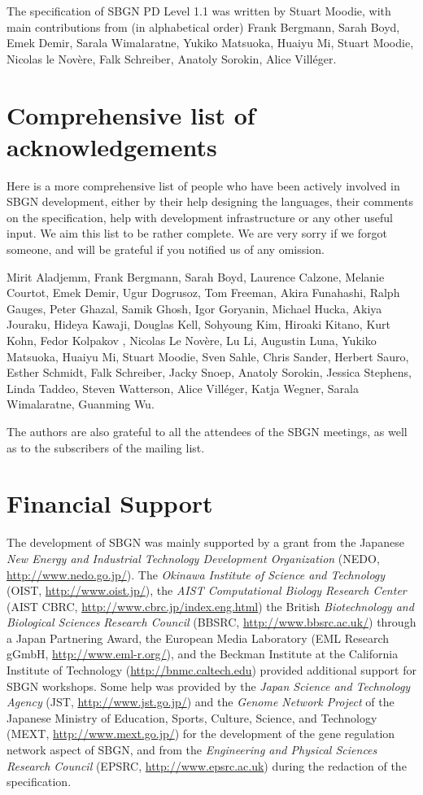The specification of SBGN PD Level 1.1 was written by Stuart Moodie, with 
main contributions from (in alphabetical order) Frank Bergmann, Sarah Boyd, 
Emek Demir, Sarala Wimalaratne, Yukiko Matsuoka, Huaiyu Mi, Stuart Moodie, 
Nicolas le Nov\`{e}re, Falk Schreiber, Anatoly Sorokin, Alice Vill\'{e}ger.

\section{Comprehensive list of acknowledgements}

Here is a more comprehensive list of people who have been actively involved 
in SBGN development, either by their help designing the languages, their 
comments on the specification, help with development infrastructure or any 
other useful input.  We aim this list to be rather complete. We are very 
sorry if we forgot someone, and will be grateful if you notified us of any 
omission.

Mirit Aladjemm, Frank Bergmann, Sarah Boyd, Laurence Calzone, Melanie 
Courtot, Emek Demir, Ugur Dogrusoz, Tom Freeman, Akira Funahashi, Ralph 
Gauges, Peter Ghazal, Samik Ghosh, Igor Goryanin, Michael Hucka, Akiya 
Jouraku, Hideya Kawaji, Douglas Kell, Sohyoung Kim, Hiroaki Kitano, Kurt 
Kohn, Fedor Kolpakov , Nicolas Le Nov\`{e}re, Lu Li, Augustin Luna, Yukiko 
Matsuoka, Huaiyu Mi, Stuart Moodie, Sven Sahle, Chris Sander, Herbert 
Sauro, Esther Schmidt, Falk Schreiber, Jacky Snoep, Anatoly Sorokin, 
Jessica Stephens, Linda Taddeo, Steven Watterson, Alice Vill\'{e}ger, Katja 
Wegner, Sarala Wimalaratne, Guanming Wu.

The authors are also grateful to all the attendees of the SBGN meetings, as 
well as to the subscribers of the  mailing list.


\section{Financial Support}

The development of SBGN was mainly supported by a grant from the Japanese \emph{New Energy and Industrial Technology Development Organization} (NEDO, \url{http://www.nedo.go.jp/}).  The \emph{Okinawa Institute of Science and Technology} (OIST, \url{http://www.oist.jp/}), the \emph{AIST Computational Biology Research Center} (AIST CBRC, \url{http://www.cbrc.jp/index.eng.html}) the British \emph{Biotechnology and Biological Sciences Research Council} (BBSRC, \url{http://www.bbsrc.ac.uk/}) through a Japan Partnering Award, the European Media Laboratory (EML Research gGmbH, \url{http://www.eml-r.org/}), and the Beckman Institute at the California Institute of Technology (\url{http://bnmc.caltech.edu}) provided additional support for SBGN workshops.  Some help was provided by the \emph{Japan Science and Technology Agency} (JST, \url{http://www.jst.go.jp/}) and the \emph{Genome Network Project} of the Japanese Ministry of Education, Sports, Culture, Science, and Technology (MEXT, \url{http://www.mext.go.jp/}) for the development of the gene regulation network aspect of SBGN, and from the \emph{Engineering and Physical Sciences Research Council} (EPSRC, \url{http://www.epsrc.ac.uk}) during the redaction of the specification.
